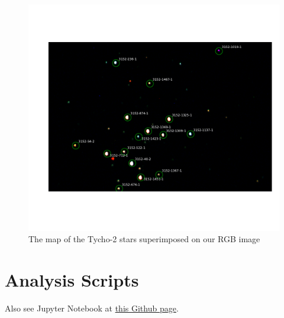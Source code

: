 \documentclass[%
aip,
jmp,
reprint,
floatfix,
nofootinbib
]{revtex4-1}
\begin{document}
	\begin{figure}[H]
		\centering
		\includegraphics[width=\textwidth]{figs/map.pdf}
		\caption{The map of the Tycho-2 stars superimposed on our RGB image\protect\footnotemark}
		\label{fig:map}
	\end{figure}

	\begin{table}[H]
		\centering
		
		\label{table:tycho}
	\end{table}

	\section{Analysis Scripts} \label{sec:scripts}
	Also see Jupyter Notebook at \href{https://github.com/mileslucas/astro344l/blob/master/lab4/src/lab4.ipynb}{this Github page}.
	
	
	
\end{document}
